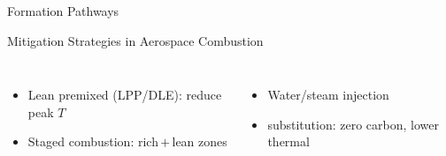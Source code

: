 \documentclass[aspectratio=169,10pt]{beamer}
\begin{document}
\begin{frame}{ Formation Pathways}
\begin{block}{Mitigation Strategies in Aerospace Combustion}
    \begin{columns}
      \begin{itemize}\small
        \item Lean premixed (LPP/DLE): reduce peak $T$
        \item Staged combustion: rich\,$+$\,lean zones
      \end{itemize}
      \begin{itemize}\small
        \item Water/steam injection
        \item {} substitution: zero carbon, lower thermal 
      \end{itemize}
    \end{columns}
  \end{block}
\end{frame}
\end{document}

